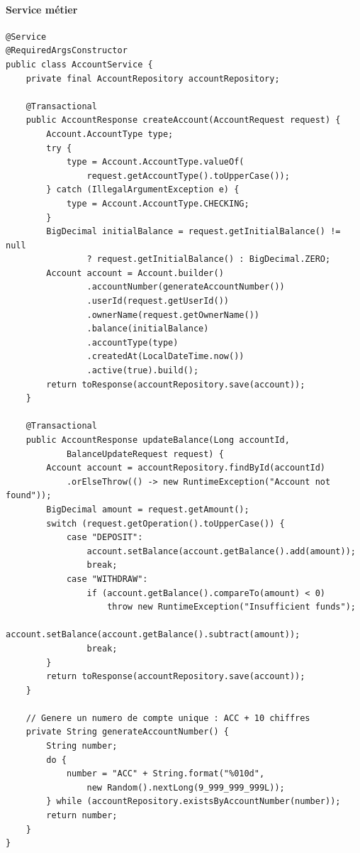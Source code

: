 \documentclass[12pt,a4paper]{article}
\begin{document}
\paragraph{Service métier}

\begin{lstlisting}[style=javastyle, caption={AccountService.java --- Logique métier de gestion des comptes (extrait)}, label=lst:accsvc]
@Service
@RequiredArgsConstructor
public class AccountService {
    private final AccountRepository accountRepository;

    @Transactional
    public AccountResponse createAccount(AccountRequest request) {
        Account.AccountType type;
        try {
            type = Account.AccountType.valueOf(
                request.getAccountType().toUpperCase());
        } catch (IllegalArgumentException e) {
            type = Account.AccountType.CHECKING;
        }
        BigDecimal initialBalance = request.getInitialBalance() != null
                ? request.getInitialBalance() : BigDecimal.ZERO;
        Account account = Account.builder()
                .accountNumber(generateAccountNumber())
                .userId(request.getUserId())
                .ownerName(request.getOwnerName())
                .balance(initialBalance)
                .accountType(type)
                .createdAt(LocalDateTime.now())
                .active(true).build();
        return toResponse(accountRepository.save(account));
    }

    @Transactional
    public AccountResponse updateBalance(Long accountId,
            BalanceUpdateRequest request) {
        Account account = accountRepository.findById(accountId)
            .orElseThrow(() -> new RuntimeException("Account not found"));
        BigDecimal amount = request.getAmount();
        switch (request.getOperation().toUpperCase()) {
            case "DEPOSIT":
                account.setBalance(account.getBalance().add(amount));
                break;
            case "WITHDRAW":
                if (account.getBalance().compareTo(amount) < 0)
                    throw new RuntimeException("Insufficient funds");
                account.setBalance(account.getBalance().subtract(amount));
                break;
        }
        return toResponse(accountRepository.save(account));
    }

    // Genere un numero de compte unique : ACC + 10 chiffres
    private String generateAccountNumber() {
        String number;
        do {
            number = "ACC" + String.format("%010d",
                new Random().nextLong(9_999_999_999L));
        } while (accountRepository.existsByAccountNumber(number));
        return number;
    }
}
\end{lstlisting}
\end{document}
